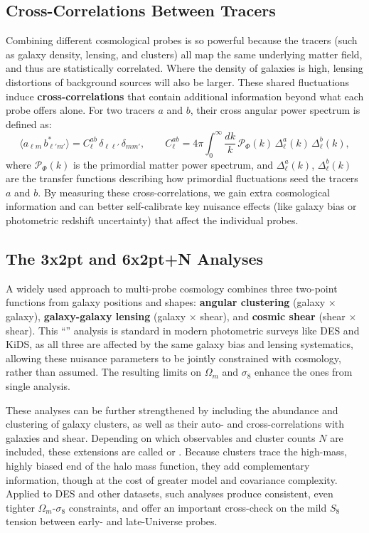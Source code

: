 \subsection{Cross-Correlations Between Tracers} \label{subsec:cross_correlation}

Combining different cosmological probes is so powerful because the tracers (such as galaxy density, lensing, and clusters) all map the same underlying matter field, and thus are statistically correlated. Where the density of galaxies is high, lensing distortions of background sources will also be larger. These shared fluctuations induce \textbf{cross-correlations} that contain additional information beyond what each probe offers alone. For two tracers $a$ and $b$, their cross angular power spectrum is defined as:
\medskip
$$
\langle a_{\ell m}\,b^*_{\ell' m'}\rangle = C_\ell^{ab}\,\delta_{\ell\ell'}\,\delta_{mm'} , \qquad
C_\ell^{ab} = 4\pi\int_0^\infty \frac{dk}{k}\,\mathcal{P}_\Phi(k)\,\Delta_\ell^a(k)\,\Delta_\ell^b(k) ,
$$
where $\mathcal{P}_\Phi(k)$ is the primordial matter power spectrum, and $\Delta_\ell^{a}(k)$, $\Delta_\ell^{b}(k)$ are the transfer functions describing how primordial fluctuations seed the tracers $a$ and $b$. By measuring these cross-correlations, we gain extra cosmological information and can better self-calibrate key nuisance effects (like galaxy bias or photometric redshift uncertainty) that affect the individual probes.

\subsection{The 3x2pt and 6x2pt+N Analyses} \label{subsec:3x2pt}

A widely used approach to multi-probe cosmology combines three two-point functions from galaxy positions and shapes: \textbf{angular clustering} (galaxy $\times$ galaxy), \textbf{galaxy-galaxy lensing} (galaxy $\times$ shear), and \textbf{cosmic shear} (shear $\times$ shear). This “” analysis is standard in modern photometric surveys like DES and KiDS, as all three are affected by the same galaxy bias and lensing systematics, allowing these nuisance parameters to be jointly constrained with cosmology, rather than assumed. The resulting limits on $\Omega_m$ and $\sigma_8$ enhance the ones from single analysis.

\smallskip

These analyses can be further strengthened by including the abundance and clustering of galaxy clusters, as well as their auto- and cross-correlations with galaxies and shear. Depending on which observables and cluster counts $N$ are included, these extensions are called  or . Because clusters trace the high-mass, highly biased end of the halo mass function, they add complementary information, though at the cost of greater model and covariance complexity. Applied to DES and other datasets, such analyses produce consistent, even tighter $\Omega_m$-$\sigma_8$ constraints, and offer an important cross-check on the mild $S_8$ tension between early- and late-Universe probes.

